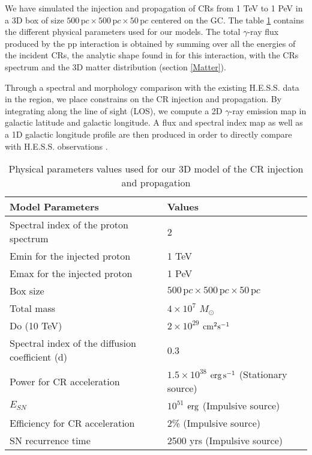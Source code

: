 \documentclass[a4paper,fleqn,usenatbib]{mnras}
\begin{document}
We have simulated the injection and propagation of CRs from 1 TeV to 1 PeV in a 3D box of size $500 \, \mathrm pc \times 500\, \mathrm pc \times 50 \, \mathrm pc$ centered on the GC. The table \ref{model_param} contains the different physical parameters used for our models. The total $\gamma$-ray flux produced by the pp interaction is obtained by summing over all the energies of the incident CRs, the analytic shape found in \citet{2006PhRvD..74c4018K} for this interaction, with the CRs spectrum and the 3D matter distribution (section \ref{Matter}).  

Through a spectral and morphology comparison with the existing H.E.S.S. data in the region, we place constrains on the CR injection and propagation. By integrating along the line of sight (LOS), we compute a 2D $\gamma$-ray emission map in galactic latitude and galactic longitude. A flux and spectral index map as well as a 1D galactic longitude profile are then produced in order to directly compare with H.E.S.S. observations \citep{2006Natur.439..695A}.


\begin{table}
\caption{Physical parameters values used for our 3D model of the CR injection and propagation}
\label{model_param}
\begin{tabular}{|p{4cm}|p{4cm}|}
	\hline
   Model Parameters & Values\\
   \hline
   Spectral index of the proton spectrum & 2 \\
   Emin for the injected proton & 1 TeV \\
   Emax for the injected proton & 1 PeV \\
   Box size & $500 \, \mathrm pc \times 500\, \mathrm pc \times 50 \, \mathrm pc$ \\
   Total mass  & $4\times 10^7$ $M_{\odot}$  \\
   Do (10 TeV) & $2\times 10^{29}$ $\rm cm^2s^{-1}$ \\
   Spectral index of the diffusion coefficient (d) & 0.3 \\
   Power for CR acceleration & $1.5 \times 10^{38}$ $\rm erg \, s^{-1}$ (Stationary source) \\
   $E_{SN}$ & $10^{51}$ $\rm erg$ (Impulsive source)\\
   Efficiency for CR acceleration & 2\% (Impulsive source)\\
   SN recurrence time & 2500 yrs (Impulsive source)\\  
\hline 
\end{tabular}
\end{table}
\end{document}
